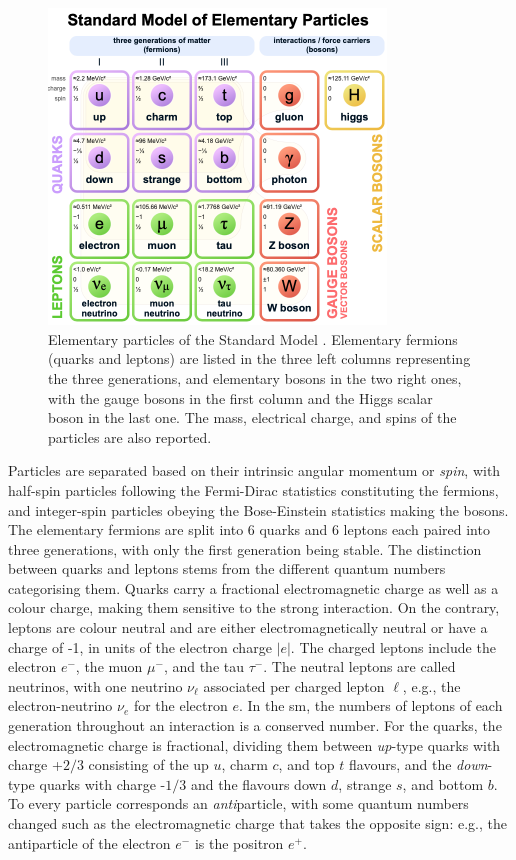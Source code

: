 \begin{figure}[!h]
    \centering
    \includegraphics[width=0.8\textwidth]{Images/Theory/SMpart.png}
    \caption[Particles in the SM]{Elementary particles of the Standard Model \cite{tableSMWiki}. Elementary fermions (quarks and leptons) are listed in the three left columns representing the three generations, and elementary bosons in the two right ones, with the gauge bosons in the first column and the Higgs scalar boson in the last one. The mass, electrical charge, and spins of the particles are also reported.}
    \label{particlesSM}
\end{figure}

Particles are separated based on their intrinsic angular momentum or \textit{spin}, with half-spin particles following the Fermi-Dirac statistics constituting the fermions, and integer-spin particles obeying the Bose-Einstein statistics making the bosons. The elementary fermions are split into 6 quarks and 6 leptons each paired into three generations, with only the first generation being stable. The distinction between quarks and leptons stems from the different quantum numbers categorising them. Quarks carry a fractional electromagnetic charge as well as a colour charge, making them sensitive to the strong interaction. On the contrary, leptons are colour neutral and are either electromagnetically neutral or have a charge of -1, in units of the electron charge $|e|$. The charged leptons include the electron $e^-$, the muon $\mu^-$, and the tau $\tau^-$. The neutral leptons are called neutrinos, with one neutrino $\nu_\ell$ associated per charged lepton $\ell$, e.g., the electron-neutrino $\nu_e$ for the electron $e$. In the \gls{sm}, the numbers of leptons of each generation throughout an interaction is a conserved number. For the quarks, the electromagnetic charge is fractional, dividing them between \textit{up}-type quarks with charge +$2/3$ consisting of the up $u$, charm $c$, and top $t$ flavours, and the \textit{down}-type quarks with charge -$1/3$ and the flavours down $d$, strange $s$, and bottom $b$. To every particle corresponds an \textit{anti}particle, with some quantum numbers changed such as the electromagnetic charge that takes the opposite sign: e.g., the antiparticle of the electron $e^-$ is the positron $e^+$. \\

